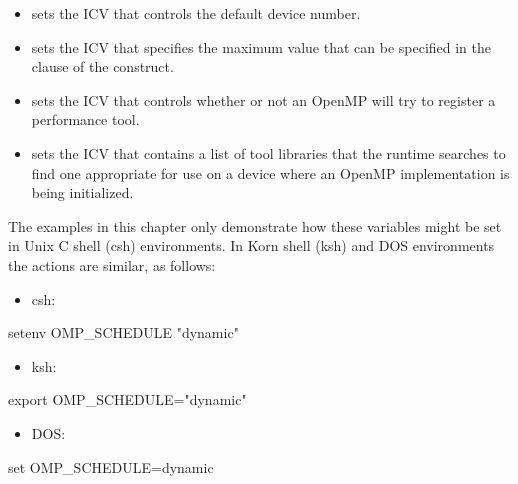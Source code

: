\begin{itemize}
\item {} sets the  ICV that controls the default 
device number.

\item {} sets the  ICV that specifies the maximum
value that can be specified in the  clause of the  construct.

\item {} sets the  ICV that controls whether or not an OpenMP will try to register a performance tool.

\item {} sets the  ICV 
that contains a list of tool libraries that the runtime searches to find
one appropriate for use on a device where an OpenMP implementation is being initialized.

\end{itemize}

The examples in this chapter only demonstrate how these variables might be set in Unix 
C shell (csh) environments. In Korn shell (ksh) and DOS environments the actions are 
similar, as follows:

\begin{itemize}
\item csh:
\end{itemize}

\begin{boxedcode}
setenv OMP\_SCHEDULE "dynamic"
\end{boxedcode}

\begin{itemize}
\item ksh:
\end{itemize}

\begin{boxedcode}
export OMP\_SCHEDULE="dynamic"
\end{boxedcode}

\begin{itemize}
\item DOS:
\end{itemize}

\begin{boxedcode}
set OMP\_SCHEDULE=dynamic
\end{boxedcode}










